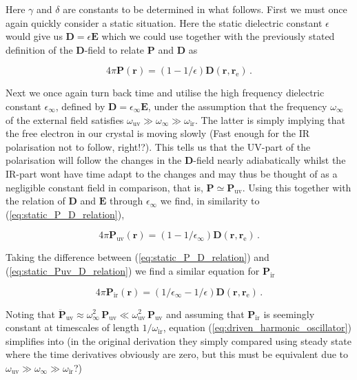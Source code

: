 \documentclass[12pt]{report}
\renewcommand{\vec}[1]{\boldsymbol{\mathbf{#1}}}                        %
\newcommand{\motivation}[1]{{\leavevmode\color{motivation}#1}}
\begin{document}
Here $ \gamma $ and $ \delta $ are constants to be determined in what follows. First we must once again quickly consider a static situation. Here the static dielectric constant $ \epsilon $ would give us $ \vec D = \epsilon \vec E $ which we could use together with the previously stated definition of the $ \vec D $-field to relate $ \vec P $ and $ \vec D $ as

\begin{equation}
	\label{eq:static_P_D_relation}
	4 \pi \vec P(\vec r) = (1 - 1/\epsilon) \vec D(\vec r, \vec r_\text{e}) \,.
\end{equation}

Next we once again turn back time and utilise the high frequency dielectric constant $ \epsilon_\infty $, defined by $ \vec D = \epsilon_\infty \vec E $, under the assumption that the frequency $ \omega_\infty $ of the external field satisfies  $ \omega_\text{uv} \gg \omega_\infty \gg \omega_\text{ir} $. The latter is simply implying that the free electron in our crystal is moving slowly \motivation{(Fast enough for the IR polarisation not to follow, right!?)}. This tells us that the UV-part of the polarisation will follow the changes in the $ \vec D $-field nearly adiabatically whilst the IR-part wont have time adapt to the changes and may thus be thought of as a negligible constant field in comparison, that is, $ \vec P \simeq \vec P_\text{uv} $. Using this together with the relation of $ \vec D $ and $ \vec E $ through $ \epsilon_\infty $ we find, in similarity to (\ref{eq:static_P_D_relation}),

\begin{equation}
	\label{eq:static_Puv_D_relation}
	4 \pi \vec P_\text{uv} (\vec r) =  (1 - 1/\epsilon_\infty) \vec D(\vec r, \vec r_\text{e}) \,.
\end{equation}

Taking the difference between (\ref{eq:static_P_D_relation}) and (\ref{eq:static_Puv_D_relation}) we find a similar equation for $ \vec P_\text{ir} $

\begin{equation}
	\label{eq:static_Pir_D_relation}
	4 \pi \vec P_\text{ir} (\vec r) =  (1/\epsilon_\infty - 1/\epsilon) \vec D(\vec r, \vec r_\text{e}) \,.
\end{equation}

Noting that $ \ddot{\vec P}_\text{uv} \approx \omega_\infty^2 \, \vec P_\text{uv} \ll \omega_\text{uv}^2 \, \vec P_\text{uv} $ and assuming that $ \vec P_\text{ir} $ is seemingly constant at timescales of length $ 1/\omega_\text{ir} $, equation (\ref{eq:driven_harmonic_oscillator}) simplifies into \motivation{(in the original derivation they simply compared using steady state where the time derivatives obviously are zero, but this must be equivalent due to $ \omega_\text{uv} \gg \omega_\infty \gg \omega_\text{ir} $?)}
\end{document}
